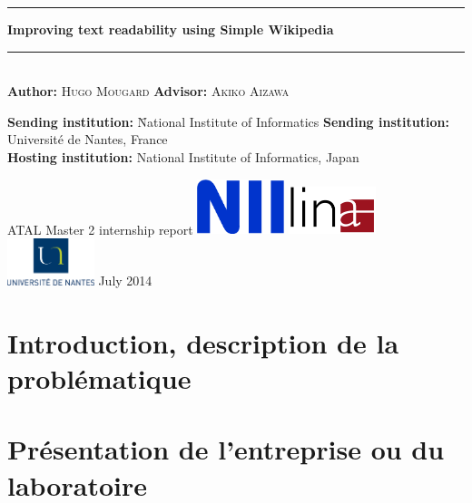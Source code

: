 \documentclass[a4paper]{scrreprt}
\begin{document}
\begin{titlepage}
  \begin{center}
    \noindent\rule{\textwidth}{0.4pt}
    {\huge\bfseries Improving text readability using Simple
      Wikipedia\\}
    \noindent\rule{\textwidth}{0.4pt}\\
    \vspace{1.5cm}
    {\large
      \textbf{Author:} \textsc{Hugo Mougard}
      \hfill
      \textbf{Advisor:} \textsc{Akiko Aizawa}}\\[5pt]
    \vfill
    \parbox{0pt}{\large \begin{tabbing}
        \textbf{Sending institution:} \= National Institute of Informatics \kill
        \textbf{Sending institution:} \> Université de Nantes, France \\
        \textbf{Hosting institution:} \> National Institute of
        Informatics, Japan \\
      \end{tabbing}}
    \vfill
    {\LARGE ATAL Master 2 internship report}
    \vfill
    \includegraphics[width=0.19\textwidth]{img/nii.png}
    \hfill
    \includegraphics[width=0.19\textwidth]{img/lina.png}
    \hfill
    \includegraphics[width=0.19\textwidth]{img/univ.eps}
    \vfill
    {July 2014}
  \end{center}
\end{titlepage}

\tableofcontents
\chapter{Introduction, description de la problématique}

\chapter{Présentation de l'entreprise ou du laboratoire}
\end{document}
